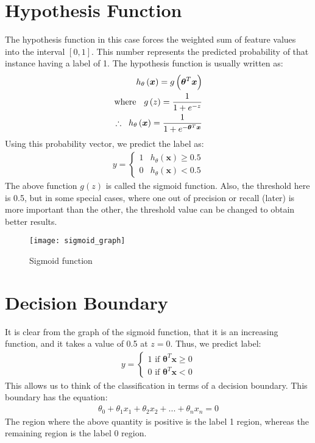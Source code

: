 \documentclass[a4paper, 12pt]{report}
\begin{document}
\section{Hypothesis Function}
The hypothesis function in this case forces the weighted sum of feature values into the interval $\left[0, 1\right]$. This number represents the predicted probability of that instance having a label of 1. The hypothesis function is usually written as:
\begin{align*}
h_{\theta}\left(\bm{x}\right) = g\left(\bm{\theta}^T\bm{x}\right) \\
\text{where } \hspace{2mm} g\left(z\right) = \dfrac{1}{1+e^{-z}} \\
\therefore \hspace{2mm} h_{\theta}\left(\bm{x}\right) = \dfrac{1}{1+e^{-\bm{\theta}^T\bm{x}}}
\end{align*}
Using this probability vector, we predict the label as:
\begin{align*}
y =
\begin{cases}
1 & h_{\theta}\left(\bm{x}\right) \geq 0.5 \\
0 & h_{\theta}\left(\bm{x}\right) < 0.5
\end{cases}
\end{align*}
The above function $g\left(z\right)$ is called the sigmoid function. Also, the threshold here is 0.5, but in some special cases, where one out of precision or recall (later) is more important than the other, the threshold value can be changed to obtain better results.
\begin{figure}[H]
\centering
\texttt{[image: sigmoid\_graph]}
\caption{Sigmoid function}
\end{figure}

\section{Decision Boundary}
It is clear from the graph of the sigmoid function, that it is an increasing function, and it takes a value of 0.5 at $z = 0$. Thus, we predict label:
\begin{align*}
y =
\begin{cases}
1 \text{ if } \bm{\theta}^T\bm{x} \geq 0 \\
0 \text{ if } \bm{\theta}^T\bm{x} < 0
\end{cases}
\end{align*}
This allows us to think of the classification in terms of a decision boundary. This boundary has the equation:
\begin{align*}
\theta_0 + \theta_1x_1 + \theta_2x_2 + ... + \theta_nx_n = 0
\end{align*}
The region where the above quantity is positive is the label 1 region, whereas the remaining region is the label 0 region.
\end{document}
